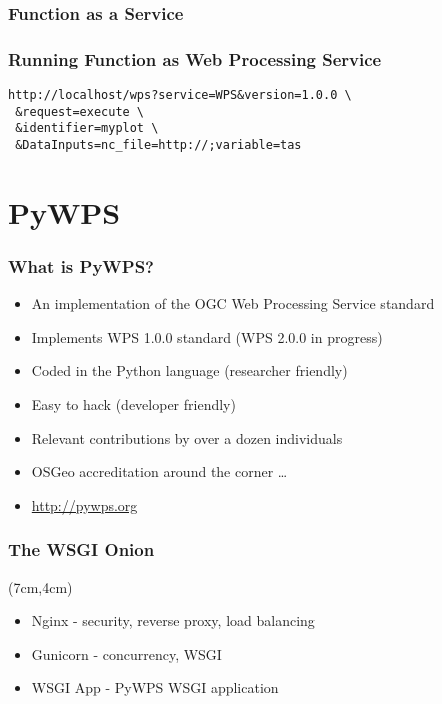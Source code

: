 \documentclass{beamer}
\begin{document}
\begin{frame}[fragile]
  \frametitle<presentation>{Function as a Service}
    \lstset{language=python} 
\end{frame}

\begin{frame}[fragile]
  \frametitle<presentation>{Running Function as Web Processing Service}
    \begin{verbatim}
http://localhost/wps?service=WPS&version=1.0.0 \
 &request=execute \
 &identifier=myplot \
 &DataInputs=nc_file=http://;variable=tas
    \end{verbatim}
\end{frame}

\section{PyWPS}

\begin{frame}
\frametitle<presentation>{What is PyWPS?}

\begin{itemize}
  \item An implementation of the OGC Web Processing Service standard
  \item Implements WPS 1.0.0 standard (WPS 2.0.0 in progress)
  \item Coded in the Python language (researcher friendly)
  \item Easy to hack (developer friendly)
  \item Relevant contributions by over a dozen individuals
  \item OSGeo accreditation around the corner \ldots
  \item \url{http://pywps.org}

\end{itemize}
\end{frame}


\begin{frame}
\frametitle<presentation>{The WSGI Onion}


\begin{textblock*}{5cm}(7cm,4cm)
\begin{itemize}
  \item Nginx - security, reverse proxy, load balancing
  \item Gunicorn - concurrency, WSGI
  \item WSGI App - PyWPS WSGI application
\end{itemize}
\end{textblock*}
\end{frame}
\end{document}
